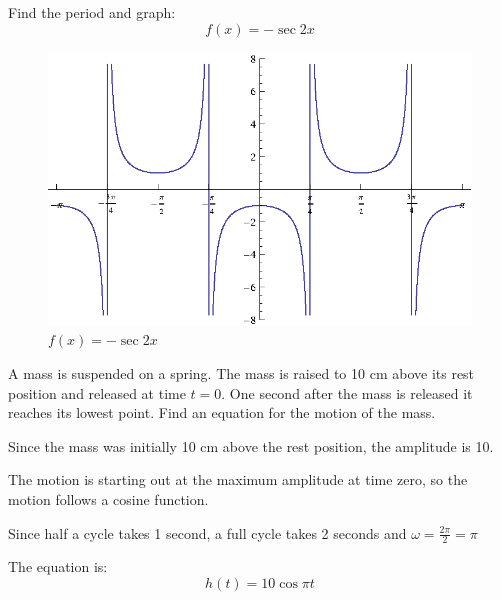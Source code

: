\documentclass[fleqn,addpoints]{exam}
\begin{document}
\begin{questions}
\begin{solution}
      \end{solution}

    \question[10]
    Find the period and graph:
      \[
        f(x) = - \sec 2x
      \]

      \begin{solution}
        \begin{figure}[H]
          \centering
          \includegraphics[scale=1.0]{graph3.eps}
          \caption{$f(x) = - \sec 2x $}
        \end{figure}

      \end{solution}

    \question[8]
      A mass is suspended on a spring.  The mass is raised to 10 cm above its rest position and released at time $t =
      0$.  One second after the mass is released it reaches its lowest point.  Find an equation for the motion of the mass.
      
      \begin{solution}
        \begin{itemize*}
          \item Since the mass was initially 10 cm above the rest position, the amplitude is 10.
          \item The motion is starting out at the maximum amplitude at time zero, so the motion follows a cosine
            function.
          \item Since half a cycle takes 1 second, a full cycle takes 2 seconds and $\omega = \frac{2 \pi}{2} = \pi$ 
        \end{itemize*}

        The equation is:
        \[
          h(t) = 10 \cos \pi t
        \]


\end{solution}
\end{questions}
\end{document}
